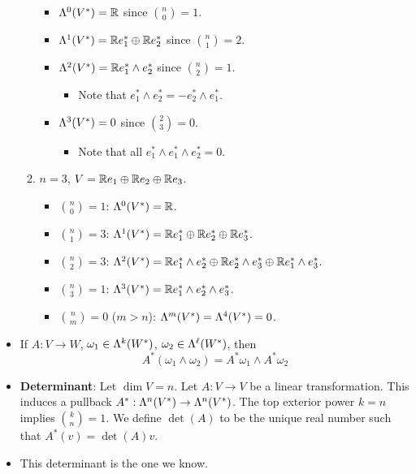 \documentclass[../notes.tex]{subfiles}
\begin{document}
\begin{itemize}
\begin{enumerate}
\begin{itemize}
            \item $\lam[0]{V^*}=\R$ since $\binom{n}{0}=1$.
            \item $\lam[1]{V^*}=\R e_1^*\oplus\R e_2^*$ since $\binom{n}{1}=2$.
            \item $\lam[2]{V^*}=\R e_1^*\wedge e_2^*$ since $\binom{n}{2}=1$.
            \begin{itemize}
                \item Note that $e_1^*\wedge e_2^*=-e_2^*\wedge e_1^*$.
            \end{itemize}
            \item $\lam[3]{V^*}=0$ since $\binom{2}{3}=0$.
            \begin{itemize}
                \item Note that all $e_1^*\wedge e_1^*\wedge e_2^*=0$.
            \end{itemize}
        \end{itemize}
        \item $n=3$, $V=\R e_1\oplus\R e_2\oplus\R e_3$.
        \begin{itemize}
            \item $\binom{n}{0}=1$: $\lam[0]{V^*}=\R$.
            \item $\binom{n}{1}=3$: $\lam[1]{V^*}=\R e_1^*\oplus\R e_2^*\oplus\R e_3^*$.
            \item $\binom{n}{2}=3$: $\lam[2]{V^*}=\R e_1^*\wedge e_2^*\oplus\R e_2^*\wedge e_3^*\oplus\R e_1^*\wedge e_3^*$.
            \item $\binom{n}{3}=1$: $\lam[3]{V^*}=\R e_1^*\wedge e_2^*\wedge e_3^*$.
            \item $\binom{n}{m}=0$ ($m>n$): $\lam[m]{V^*}=\lam[4]{V^*}=0$.
        \end{itemize}
    \end{enumerate}
    \item If $A:V\to W$, $\omega_1\in\lam[k]{W^*}$, $\omega_2\in\lam[\ell]{W^*}$, then
    \begin{equation*}
        A^*(\omega_1\wedge\omega_2) = A^*\omega_1\wedge A^*\omega_2
    \end{equation*}
    \item \textbf{Determinant}: Let $\dim V=n$. Let $A:V\to V$ be a linear transformation. This induces a pullback $A^*:\lam[n]{V^*}\to\lam[n]{V^*}$. The top exterior power $k=n$ implies $\binom{k}{n}=1$. We define $\det(A)$ to be the unique real number such that $A^*(v)=\det(A)v$.
    \item This determinant is the one we know.

\end{itemize}
\end{document}

